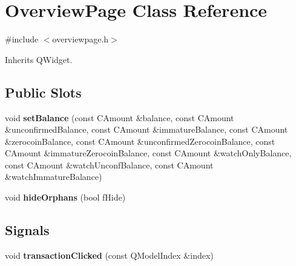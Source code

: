 \hypertarget{class_overview_page}{}\section{Overview\+Page Class Reference}
\label{class_overview_page}


{\ttfamily \#include $<$overviewpage.\+h$>$}



Inherits Q\+Widget.

\subsection*{Public Slots}
\begin{DoxyCompactItemize}
\item 
\mbox{\label{class_overview_page_a93fac198949a3e71a92a3f67ee5753a1}} 
void {\bfseries set\+Balance} (const C\+Amount \&balance, const C\+Amount \&unconfirmed\+Balance, const C\+Amount \&immature\+Balance, const C\+Amount \&zerocoin\+Balance, const C\+Amount \&unconfirmed\+Zerocoin\+Balance, const C\+Amount \&immature\+Zerocoin\+Balance, const C\+Amount \&watch\+Only\+Balance, const C\+Amount \&watch\+Unconf\+Balance, const C\+Amount \&watch\+Immature\+Balance)
\item 
\mbox{\label{class_overview_page_a9b652d7bbe7d436953a6b6c48a404e7a}} 
void {\bfseries hide\+Orphans} (bool f\+Hide)
\end{DoxyCompactItemize}
\subsection*{Signals}
\begin{DoxyCompactItemize}
\item 
\mbox{\label{class_overview_page_aa75e17f571b13dfcdd6f5251cbfe966d}} 
void {\bfseries transaction\+Clicked} (const Q\+Model\+Index \&index)
\end{DoxyCompactItemize}
